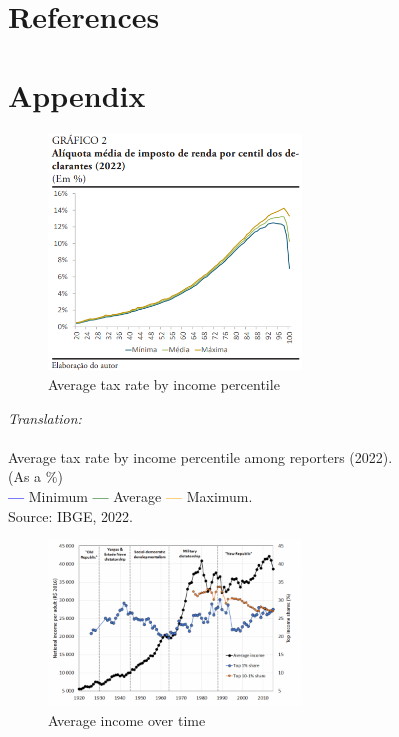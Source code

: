 \documentclass[a4paper, 12pt]{article}
\begin{document}
\newpage

\section*{References}

\printbibliography[heading=none]
\newpage

\section*{Appendix}

\begin{figure}[H]
    \centering
    \includegraphics[width=0.6\textwidth]{aliquota.png}
    \caption{Average tax rate by income percentile}
    \label{tab:Figure 1}
\end{figure}

{\Large{\textit{Translation:}}}
\\
\\
Average tax rate by income percentile among reporters (2022).
\\
(As a \%)
\\
\textcolor{blue}{\textbf{---}} Minimum \textcolor{darkgreen}{\textbf{---}} Average \textcolor{orange}{\textbf{---}} Maximum.
\\
Source: IBGE, 2022.
\\
\begin{figure}[H]
    \centering
    \includegraphics[width=0.6\textwidth]{oneperc.png}
    \caption{Average income over time}
    \label{tab:Figure 2}
\end{figure}
\end{document}
